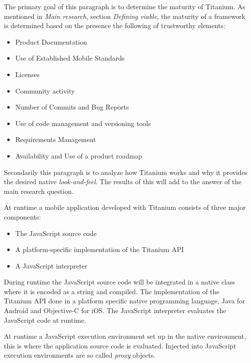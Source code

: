 
\noindent The primary goal of this paragraph is to determine the maturity of Titanium. As mentioned in \emph{Main research}, section \emph{Defining viable}, the maturity of a framework is determined based on the presence the following of trustworthy elements:

\begin{itemize}
  \setlength{\itemsep}{1pt}
  \setlength{\parskip}{0pt}
  \setlength{\parsep}{0pt}
\item Product Documentation
\item Use of Established Mobile Standards
\item Licenses
\item Community activity
\item Number of Commits and Bug Reports
\item Use of code management and versioning tools
\item Requirements Management
\item Availability and Use of a product roadmap
\end{itemize}

Secondarily this paragraph is to analyze how Titanium works and why it provides the desired native \emph{look-and-feel}. The results of this will add to the answer of the main research question.




At runtime a mobile application developed with Titanium consists of three major components:
\begin{itemize}
	\item
	The JavaScript source code
	\item
	A platform-specific implementation of the Titanium API
	\item
	A JavaScript interpreter
\end{itemize}

During runtime the JavaScript source code will be integrated in a native class where it is encoded as a string and compiled. The implementation of the Titanium API done in a platform specific native programming language, Java for Android and Objective-C for iOS. The JavaScript interpreter evaluates the JavaScript code at runtime.


At runtime a JavaScript execution environment set up in the native environment, this is where the application source code is evaluated. Injected into JavaScript execution environments are so called \emph{proxy} objects.

